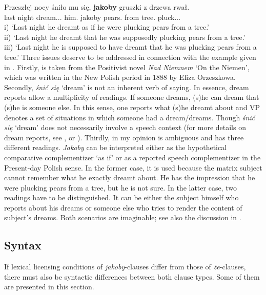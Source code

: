 \documentclass[output=paper
,modfonts
,nonflat]{langsci/langscibook}
\begin{document}
\ea \gll Przeszłej nocy śniło mu się, \textbf{jakoby} gruszki z drzewa rwał. \label{gruszki} \\
		last night dream.{\lptcp}.{\sg}.{\n} him.{\dat} {} jakoby pears.{\acc} from tree.{\gen} pluck.{\lptcp}.{\sg}.{\fem} \\
	\glt	i) `Last night he dreamt as if he were plucking pears from a tree.' \\
	\glt	ii) `Last night he dreamt that he was supposedly plucking pears from a tree.' \\
	\glt	iii) `Last night he is supposed to have dreamt that he was plucking pears from a tree.'   
\z		
Three issues deserve to be addressed in connection with the example given in . Firstly,  is taken from the Positivist novel \emph{Nad Niemnem} `On the Niemen', which was written in the New Polish period in 1888 by Eliza Orzeszkowa. Secondly, \emph{śnić się} `dream' is not an inherent verb of saying. In essence, dream reports allow a multiplicity of readings. If someone dreams, (s)he can dream that (s)he is someone else. In this sense, one reports what (s)he dreamt about and VP denotes a set of situations in which someone had a dream\slash dreams. Though  \emph{śnić się} `dream' does not necessarily involve a speech context (for more details on dream reports, see \textcite{Shanon1980}, \textcite{Percus-Sauerland2003} or \textcite{Kauf2017}). Thirdly, in my opinion  is ambiguous and has three different readings. \emph{Jakoby} can be interpreted either as the hypothetical comparative complementizer `as if' or as a reported speech complementizer in the Present-day Polish sense. In the former case, it is used because the matrix subject cannot remember what he exactly dreamt about. He has the impression that he were plucking pears from a tree, but he is not sure. In the latter case, two readings have to be distinguished. It can be either the subject himself who reports about his dreams or someone else who tries to render the content of subject's dreams. Both scenarios are imaginable; see also the discussion in .                    

\subsection{Syntax}

If lexical licensing conditions of \emph{jakoby}-clauses differ from those of \emph{że}-clauses, there must also be syntactic differences between both clause types. Some of them are presented in this section.  
\end{document}
